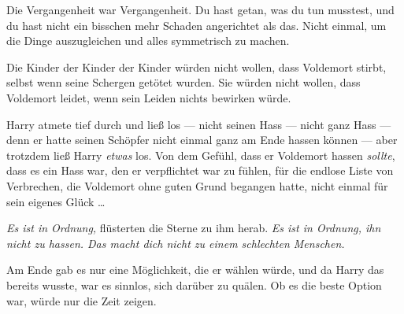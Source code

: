 Die Vergangenheit war Vergangenheit. Du hast getan, was du tun musstest, und du hast nicht ein bisschen mehr Schaden angerichtet als das. Nicht einmal, um die Dinge auszugleichen und alles symmetrisch zu machen.

Die Kinder der Kinder der Kinder würden nicht wollen, dass Voldemort stirbt, selbst wenn seine Schergen getötet wurden. Sie würden nicht wollen, dass Voldemort leidet, wenn sein Leiden nichts bewirken würde.

Harry atmete tief durch und ließ los — nicht seinen Hass — nicht ganz Hass — denn er hatte seinen Schöpfer nicht einmal ganz am Ende hassen können — aber trotzdem ließ Harry \emph{etwas} los. Von dem Gefühl, dass er Voldemort hassen \emph{sollte}, dass es ein Hass war, den er verpflichtet war zu fühlen, für die endlose Liste von Verbrechen, die Voldemort ohne guten Grund begangen hatte, nicht einmal für sein eigenes Glück …

\emph{Es ist in Ordnung,} flüsterten die Sterne zu ihm herab. \emph{Es ist in Ordnung, ihn nicht zu hassen. Das macht dich nicht zu einem schlechten Menschen.}

Am Ende gab es nur eine Möglichkeit, die er wählen würde, und da Harry das bereits wusste, war es sinnlos, sich darüber zu quälen. Ob es die beste Option war, würde nur die Zeit zeigen.

